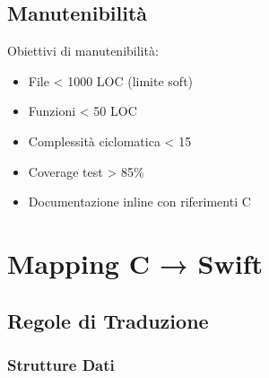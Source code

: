\subsection{Manutenibilità}

Obiettivi di manutenibilità:
\begin{itemize}
\item File < 1000 LOC (limite soft)
\item Funzioni < 50 LOC
\item Complessità ciclomatica < 15
\item Coverage test > 85\%
\item Documentazione inline con riferimenti C
\end{itemize}

\section{Mapping C → Swift}

\subsection{Regole di Traduzione}

\subsubsection{Strutture Dati}

